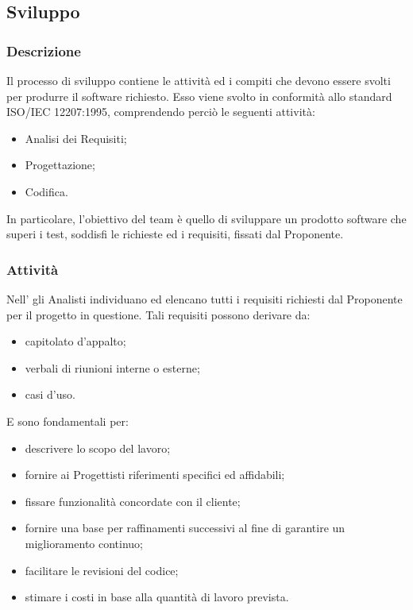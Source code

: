 \subsection{Sviluppo}
	\subsubsection{Descrizione}
	Il processo di sviluppo contiene le attività ed i compiti che devono essere svolti per produrre il software richiesto. Esso viene svolto in conformità allo standard ISO/IEC 12207:1995, comprendendo perciò le seguenti attività:
	\begin{itemize}
		\item{Analisi dei Requisiti;}
		\item{Progettazione;}
		\item{Codifica.}
	\end{itemize}
	
	In particolare, l'obiettivo del team è quello di sviluppare un prodotto software che superi i test, soddisfi le richieste ed i requisiti, fissati dal Proponente.
    
    \subsubsection{Attività}
          	Nell'\AdR{} gli Analisti individuano ed elencano tutti i requisiti richiesti dal Proponente per il progetto in questione. Tali requisiti possono derivare da:
     \begin{itemize}
           		\item{capitolato d'appalto;}
				\item{verbali di riunioni interne o esterne;}
				\item{casi d'uso.}
    	\end{itemize}
          	
          	E sono fondamentali per:
        \begin{itemize}
       		\item{descrivere lo scopo del lavoro;}
			\item{fornire ai Progettisti riferimenti specifici ed affidabili;}
			\item{fissare funzionalità concordate con il cliente;}
			\item{fornire una base per raffinamenti successivi al fine di garantire un miglioramento continuo;}
			\item{facilitare le revisioni del codice;}
			\item{stimare i costi in base alla quantità di lavoro prevista.}
       	\end{itemize}                 
         
